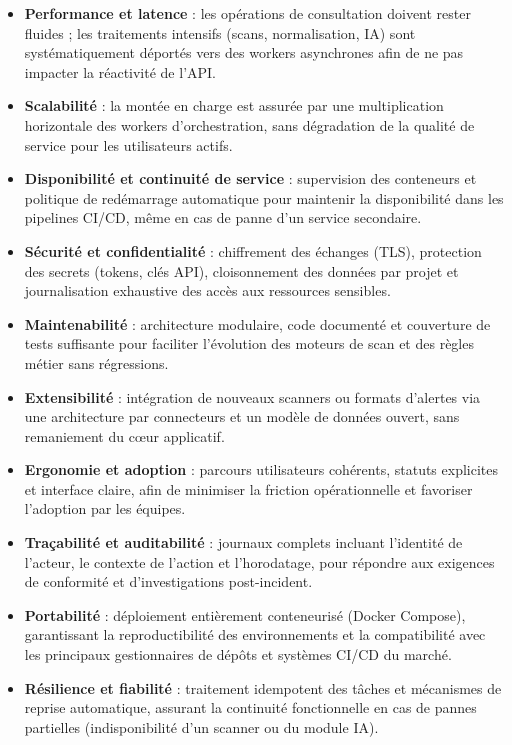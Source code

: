 \begin{itemize}
  \item \textbf{Performance et latence} : les opérations de consultation doivent rester
  fluides ; les traitements intensifs (scans, normalisation, IA) sont systématiquement
  déportés vers des workers asynchrones afin de ne pas impacter la réactivité de l'API.

  \item \textbf{Scalabilité} : la montée en charge est assurée par une multiplication
  horizontale des workers d'orchestration, sans dégradation de la qualité de service
  pour les utilisateurs actifs.

  \item \textbf{Disponibilité et continuité de service} : supervision des conteneurs
  et politique de redémarrage automatique pour maintenir la disponibilité dans les
  pipelines CI/CD, même en cas de panne d'un service secondaire.

  \item \textbf{Sécurité et confidentialité} : chiffrement des échanges (TLS),
  protection des secrets (tokens, clés API), cloisonnement des données par projet
  et journalisation exhaustive des accès aux ressources sensibles.

  \item \textbf{Maintenabilité} : architecture modulaire, code documenté et couverture
  de tests suffisante pour faciliter l'évolution des moteurs de scan et des règles
  métier sans régressions.

  \item \textbf{Extensibilité} : intégration de nouveaux scanners ou formats d'alertes
  via une architecture par connecteurs et un modèle de données ouvert, sans remaniement
  du cœur applicatif.

  \item \textbf{Ergonomie et adoption} : parcours utilisateurs cohérents, statuts
  explicites et interface claire, afin de minimiser la friction opérationnelle et
  favoriser l'adoption par les équipes.

  \item \textbf{Traçabilité et auditabilité} : journaux complets incluant l'identité
  de l'acteur, le contexte de l'action et l'horodatage, pour répondre aux exigences
  de conformité et d'investigations post-incident.

  \item \textbf{Portabilité} : déploiement entièrement conteneurisé (Docker Compose),
  garantissant la reproductibilité des environnements et la compatibilité avec les
  principaux gestionnaires de dépôts et systèmes CI/CD du marché.

  \item \textbf{Résilience et fiabilité} : traitement idempotent des tâches et
  mécanismes de reprise automatique, assurant la continuité fonctionnelle en cas
  de pannes partielles (indisponibilité d'un scanner ou du module IA).
\end{itemize}

